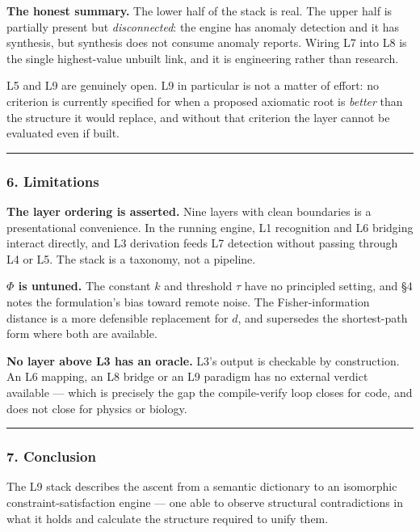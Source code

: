 \documentclass[
  11pt,
  a4paper,
]{article}
\begin{document}
\textbf{The honest summary.} The lower half of the stack is real. The
upper half is partially present but \emph{disconnected}: the engine has
anomaly detection and it has synthesis, but synthesis does not consume
anomaly reports. Wiring L7 into L8 is the single highest-value unbuilt
link, and it is engineering rather than research.

L5 and L9 are genuinely open. L9 in particular is not a matter of
effort: no criterion is currently specified for when a proposed
axiomatic root is \emph{better} than the structure it would replace, and
without that criterion the layer cannot be evaluated even if built.

\begin{center}\rule{0.5\linewidth}{0.5pt}\end{center}

\subsubsection{6. Limitations}\label{limitations-1}

\textbf{The layer ordering is asserted.} Nine layers with clean
boundaries is a presentational convenience. In the running engine, L1
recognition and L6 bridging interact directly, and L3 derivation feeds
L7 detection without passing through L4 or L5. The stack is a taxonomy,
not a pipeline.

\textbf{\(\Phi\) is untuned.} The constant \(k\) and threshold \(\tau\)
have no principled setting, and §4 notes the formulation's bias toward
remote noise. The Fisher-information distance is a more defensible
replacement for \(d\), and supersedes the shortest-path form where both
are available.

\textbf{No layer above L3 has an oracle.} L3's output is checkable by
construction. An L6 mapping, an L8 bridge or an L9 paradigm has no
external verdict available --- which is precisely the gap the
compile-verify loop closes for code, and does not close for physics or
biology.

\begin{center}\rule{0.5\linewidth}{0.5pt}\end{center}

\subsubsection{7. Conclusion}\label{conclusion-2}

The L9 stack describes the ascent from a semantic dictionary to an
isomorphic constraint-satisfaction engine --- one able to observe
structural contradictions in what it holds and calculate the structure
required to unify them.
\end{document}
